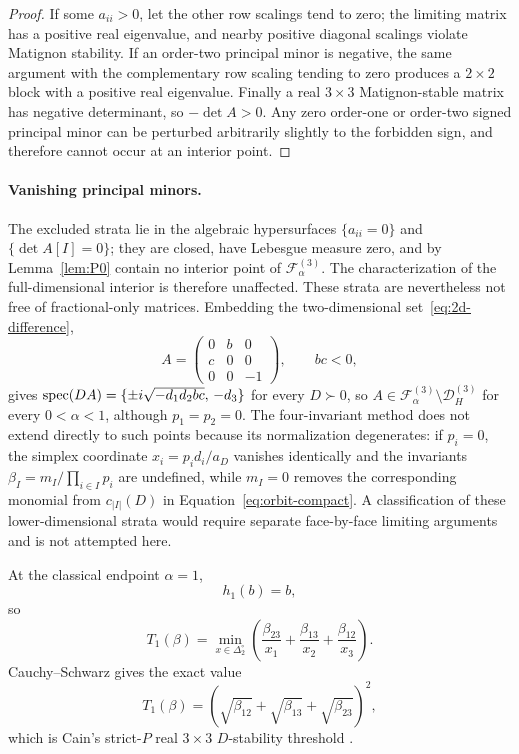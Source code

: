 \begin{proof}
If some \(a_{ii}>0\), let the other row scalings tend to zero; the limiting matrix has a positive real eigenvalue, and nearby positive diagonal scalings violate Matignon stability. If an order-two principal minor is negative, the same argument with the complementary row scaling tending to zero produces a \(2\times2\) block with a positive real eigenvalue. Finally a real \(3\times3\) Matignon-stable matrix has negative determinant, so \(-\det A>0\). Any zero order-one or order-two signed principal minor can be perturbed arbitrarily slightly to the forbidden sign, and therefore cannot occur at an interior point.
\end{proof}

\paragraph{Vanishing principal minors.}
The excluded strata lie in the algebraic hypersurfaces \(\{a_{ii}=0\}\) and \(\{\det A[I]=0\}\); they are closed, have Lebesgue measure zero, and by Lemma~\ref{lem:P0} contain no interior point of \(\mathcal F_\alpha^{(3)}\). The characterization of the full-dimensional interior is therefore unaffected. These strata are nevertheless not free of fractional-only matrices. Embedding the two-dimensional set~\eqref{eq:2d-difference},
\[
A=\begin{pmatrix}0&b&0\\c&0&0\\0&0&-1\end{pmatrix},\qquad bc<0,
\]
gives \(\operatorname{spec}(DA)=\{\pm i\sqrt{-d_1d_2bc},\,-d_3\}\) for every \(D\succ0\), so \(A\in\mathcal F_\alpha^{(3)}\setminus\mathcal D_H^{(3)}\) for every \(0<\alpha<1\), although \(p_1=p_2=0\). The four-invariant method does not extend directly to such points because its normalization degenerates: if \(p_i=0\), the simplex coordinate \(x_i=p_id_i/a_D\) vanishes identically and the invariants \(\beta_I=m_I/\prod_{i\in I}p_i\) are undefined, while \(m_I=0\) removes the corresponding monomial from \(c_{|I|}(D)\) in Equation~\eqref{eq:orbit-compact}. A classification of these lower-dimensional strata would require separate face-by-face limiting arguments and is not attempted here.

At the classical endpoint \(\alpha=1\),
\[
h_1(b)=b,
\]
so
\begin{equation}
T_1(\beta)
=
\min_{x\in\Delta_2^\circ}
\left(
\frac{\beta_{23}}{x_1}
+
\frac{\beta_{13}}{x_2}
+
\frac{\beta_{12}}{x_3}
\right).
\end{equation}
Cauchy--Schwarz gives the exact value
\begin{equation}
\boxed{
T_1(\beta)
=
\left(
\sqrt{\beta_{12}}+
\sqrt{\beta_{13}}+
\sqrt{\beta_{23}}
\right)^2,
}
\label{eq:T1}
\end{equation}
which is Cain's strict-\(P\) real \(3\times3\) \(D\)-stability threshold \cite{Cain1976}.

